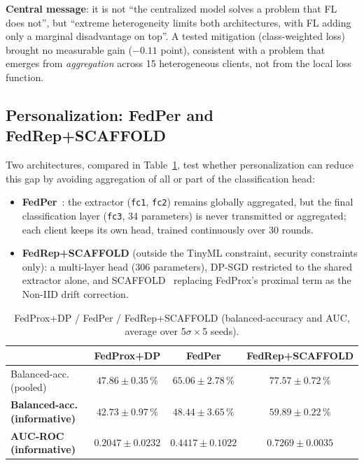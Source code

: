 \documentclass{acmart}
\begin{document}
\textbf{Central message}: it is not ``the centralized model solves a problem that FL
does not'', but ``extreme heterogeneity limits both architectures, with FL adding only
a marginal disadvantage on top''. A tested mitigation (class-weighted loss) brought no
measurable gain ($-0.11$ point), consistent with a problem that emerges from
\emph{aggregation} across 15 heterogeneous clients, not from the local loss function.

\subsection{Personalization: FedPer and FedRep+SCAFFOLD}

Two architectures, compared in Table~\ref{tab:perso}, test whether personalization
can reduce this gap by avoiding aggregation of all or part of the classification
head:

\begin{itemize}
\item \textbf{FedPer}~\cite{arivazhagan2019federated}: the extractor (\texttt{fc1},
\texttt{fc2}) remains globally aggregated, but the final classification layer
(\texttt{fc3}, 34 parameters) is never transmitted or aggregated; each client keeps
its own head, trained continuously over 30 rounds.
\item \textbf{FedRep+SCAFFOLD} (outside the TinyML constraint, security constraints
only): a multi-layer head (306 parameters), DP-SGD restricted to the shared
extractor alone, and SCAFFOLD~\cite{karimireddy2020scaffold} replacing FedProx's
proximal term as the Non-IID drift correction.
\end{itemize}

\begin{table}[h!]
\centering
\small
\caption{FedProx+DP / FedPer / FedRep+SCAFFOLD (balanced-accuracy and AUC, average
over 5$\sigma\times$5 seeds).}
\label{tab:perso}
\begin{tabular}{lccc}
\toprule
 & FedProx+DP & FedPer & FedRep+SCAFFOLD \\
\midrule
Balanced-acc. (pooled)         & $47.86\pm0.35\,\%$ & $65.06\pm2.78\,\%$ & $\mathbf{77.57\pm0.72\,\%}$ \\
\textbf{Balanced-acc. (informative)} & $42.73\pm0.97\,\%$ & $48.44\pm3.65\,\%$ & $\mathbf{59.89\pm0.22\,\%}$ \\
\textbf{AUC-ROC (informative)} & $0.2047\pm0.0232$ & $0.4417\pm0.1022$ & $\mathbf{0.7269\pm0.0035}$ \\
\bottomrule
\end{tabular}
\end{table}
\end{document}
